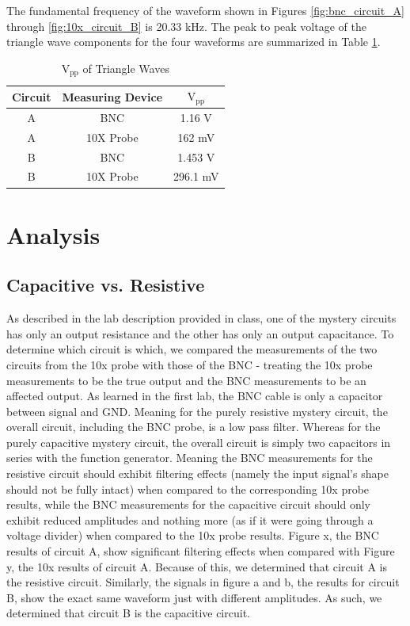 \documentclass[12pt,letterpaper]{report}
\begin{document}
The fundamental frequency of the waveform shown in Figures \ref{fig:bnc_circuit_A} through \ref{fig:10x_circuit_B} is 20.33 kHz. The peak to peak voltage of the triangle wave components for the four waveforms are summarized in Table \ref{table:vpp}.

\begin{table}[ht]
\caption{$\text{V}_{\text{pp}}$ of Triangle Waves} %
\centering 
    \begin{tabular}{| c | c | c |}
    \hline  
    Circuit & Measuring Device & $\text{V}_{\text{pp}}$ \\
    \hline
    A & BNC & 1.16 V \\
    A & 10X Probe & 162 mV \\
    B & BNC & 1.453 V \\
    B & 10X Probe & 296.1 mV \\
    \hline
    \end{tabular}
    \label{table:vpp}
\end{table}

\section*{Analysis}

\subsection*{Capacitive vs. Resistive}
As described in the lab description provided in class, one of the mystery circuits has only an output resistance and the other has only an output capacitance. To determine which circuit is which, we compared the measurements of the two circuits from the 10x probe with those of the BNC - treating the 10x probe measurements to be the true output and the BNC measurements to be an affected output. As learned in the first lab, the BNC cable is only a capacitor between signal and GND. Meaning for the purely resistive mystery circuit, the overall circuit, including the BNC probe, is a low pass filter. Whereas for the purely capacitive mystery circuit, the overall circuit is simply two capacitors in series with the function generator. Meaning the BNC measurements for the resistive circuit should exhibit filtering effects (namely the input signal's shape should not be fully intact) when compared to the corresponding 10x probe results, while the BNC measurements for the capacitive circuit should only exhibit reduced amplitudes and nothing more (as if it were going through a voltage divider) when compared to the 10x probe results. Figure x, the BNC results of circuit A, show significant filtering effects when compared with Figure y, the 10x results of circuit A. Because of this, we determined that circuit A is the resistive circuit. Similarly, the signals in figure a and b, the results for circuit B, show the exact same waveform just with different amplitudes. As such, we determined that circuit B is the capacitive circuit.
\end{document}
